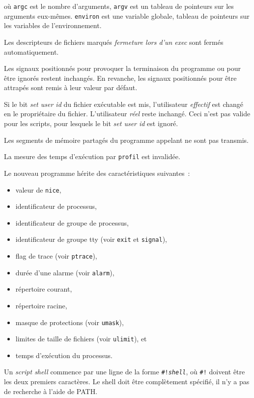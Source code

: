 \documentclass [twoside] {report}
\begin{document}
où \texttt {argc} est le nombre d'arguments, \texttt {argv}
est un tableau de pointeurs sur les arguments
eux-mêmes. \texttt {environ} est une variable globale,
tableau de pointeurs sur les variables de l'environnement.

Les descripteurs de fichiers marqués \textit {fermeture
lors d'un exec} sont fermés automatiquement.

Les signaux positionnés pour provoquer la terminaison
du programme ou pour être ignorés restent
inchangés. En revanche, les signaux positionnés
pour être attrapés sont remis à leur valeur par
défaut.

Si le bit \textit {set user id} du fichier exécutable
est mis, l'utilisateur \textit {effectif} est changé en le
propriétaire du fichier. L'utilisateur \textit {réel}
reste inchangé. Ceci n'est pas valide pour les
scripts, pour lesquels le bit \textit {set user id} est
ignoré.

Les segments de mémoire partagés du programme
appelant ne sont pas transmis.

La mesure des temps d'exécution par \texttt {profil} est
invalidée.

Le nouveau programme hérite des caractéristiques
suivantes~:
\begin {itemize}
    \item valeur de \texttt {nice},
    \item identificateur de processus,
    \item identificateur de groupe de processus,
    \item identificateur de groupe tty (voir \texttt {exit} et \texttt {signal}),
    \item flag de trace (voir \texttt {ptrace}),
    \item durée d'une alarme (voir \texttt {alarm}),
    \item répertoire courant,
    \item répertoire racine,
    \item masque de protections (voir \texttt {umask}),
    \item limites de taille de fichiers (voir \texttt {ulimit}), et
    \item temps d'exécution du processus.
\end {itemize}

Un \textit {script shell} commence par une ligne de la
forme \texttt {\#!\textit {shell}}, où \texttt {\#!} doivent être les deux
premiers caractères. Le shell doit être
complètement spécifié, il n'y a pas de recherche à
l'aide de PATH.
\end{document}
